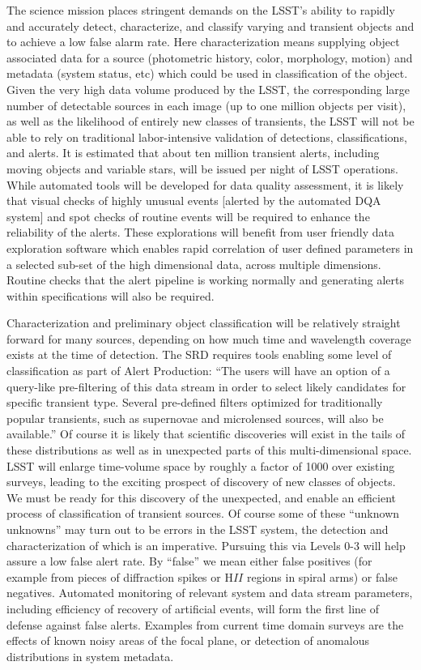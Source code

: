 \documentclass[SE,toc,lsstdraft]{lsstdoc}
\begin{document}
The science mission places stringent demands on the LSST's ability to rapidly and accurately detect, characterize, and classify varying and transient objects and to achieve a low false alarm rate.  Here characterization means supplying object associated data for a source (photometric history, color, morphology, motion) and metadata (system status, etc) which could be used in classification of the object.  Given the very high data volume  produced by the LSST, the corresponding large number of detectable sources in each  image (up to one million objects per visit), as well as the  likelihood of entirely new classes of transients, the LSST will not be able  to rely on traditional labor-intensive validation of detections,  classifications, and alerts.  It is estimated that about ten million transient alerts, including moving objects and variable stars, will be issued per night of LSST operations. While automated tools will be developed for data quality assessment, it is likely that visual checks of highly unusual events [alerted by the automated DQA system] and spot checks of routine events will be required to enhance the reliability of the alerts.
These explorations will benefit from user friendly data exploration software which enables rapid correlation of user defined parameters in a selected sub-set of the high dimensional data, across multiple dimensions.
Routine checks that the alert pipeline is working normally and generating alerts within specifications will also be required.

Characterization and preliminary object classification will be relatively straight forward for many sources, depending on how much time and wavelength coverage exists at the time of detection. The SRD requires tools enabling some level of classification as part of Alert Production:  ``The users will have an option of a query-like pre-filtering of this data stream in order to select likely candidates for specific transient type. Several pre-defined filters optimized for traditionally popular transients, such as supernovae and microlensed sources, will also be available.''  Of course it is likely that scientific discoveries will exist in the tails of these distributions as well as in unexpected parts of this multi-dimensional space.  LSST will enlarge time-volume space by roughly a factor of 1000 over existing surveys, leading to the exciting prospect of discovery of new classes of objects.  We must be ready for this discovery of the unexpected, and enable an efficient process of classification of transient sources.  Of course some of these ``unknown unknowns'' may turn out to be errors in the LSST system, the detection and characterization of which is an imperative.  Pursuing this via Levels 0-3 will help assure a low false alert rate. By ``false'' we mean either false positives (for example from pieces of diffraction spikes or H$II$ regions in spiral arms) or false negatives. Automated monitoring of relevant system and data stream parameters, including efficiency of recovery of artificial events, will form the first line of defense against false alerts. Examples from current time domain surveys are the effects of known noisy areas of the focal plane, or detection of anomalous distributions in system metadata.
\end{document}
